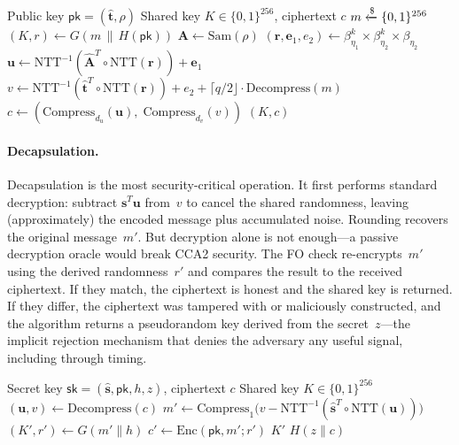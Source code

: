 \begin{algorithm}[t]
\caption{ML-KEM.$\Encaps$}
\label{alg:mlkem-encaps}
\begin{algorithmic}[1]
\Require Public key $\mathsf{pk} = (\hat{\mathbf{t}}, \rho)$
\Ensure Shared key $K \in \{0,1\}^{256}$, ciphertext $c$
\State $m \getsr \{0,1\}^{256}$
\State $(K, r) \gets G(m \,\|\, H(\mathsf{pk}))$ 
\State $\mathbf{A} \gets \mathrm{Sam}(\rho)$
\State $(\mathbf{r}, \mathbf{e}_1, e_2) \leftarrow \beta_{\eta_1}^k \times \beta_{\eta_2}^k \times \beta_{\eta_2}$ 
\State $\mathbf{u} \gets \mathrm{NTT}^{-1}(\hat{\mathbf{A}}^T \circ \mathrm{NTT}(\mathbf{r})) + \mathbf{e}_1$ 
\State $v \gets \mathrm{NTT}^{-1}(\hat{\mathbf{t}}^T \circ \mathrm{NTT}(\mathbf{r})) + e_2 + \lceil q/2 \rfloor\cdot \mathrm{Decompress}(m)$
\State $c \gets (\mathrm{Compress}_{d_u}(\mathbf{u}),\; \mathrm{Compress}_{d_v}(v))$
\State \Return $(K, c)$
\end{algorithmic}
\end{algorithm}

\paragraph{Decapsulation.}
Decapsulation is the most security-critical operation.  It first performs standard \mlwe{} decryption: subtract $\mathbf{s}^T \mathbf{u}$ from~$v$ to cancel the shared randomness, leaving (approximately) the encoded message plus accumulated noise.  Rounding recovers the original message~$m'$.  But decryption alone is not enough---a passive decryption oracle would break CCA2 security.  The FO check re-encrypts~$m'$ using the derived randomness~$r'$ and compares the result to the received ciphertext.  If they match, the ciphertext is honest and the shared key is returned.  If they differ, the ciphertext was tampered with or maliciously constructed, and the algorithm returns a pseudorandom key derived from the secret~$z$---the implicit rejection mechanism that denies the adversary any useful signal, including through timing.

\begin{algorithm}[t]
\caption{ML-KEM.$\Decaps$}
\label{alg:mlkem-decaps}
\begin{algorithmic}[1]
\Require Secret key $\mathsf{sk} = (\hat{\mathbf{s}}, \mathsf{pk}, h, z)$, ciphertext $c$
\Ensure Shared key $K \in \{0,1\}^{256}$
\State $(\mathbf{u}, v) \gets \mathrm{Decompress}(c)$
\State $m' \gets \mathrm{Compress}_1\bigl(v - \mathrm{NTT}^{-1}(\hat{\mathbf{s}}^T \circ \mathrm{NTT}(\mathbf{u}))\bigr)$ 
\State $(K', r') \gets G(m' \| h)$
\State $c' \gets \mathrm{Enc}(\mathsf{pk}, m'; r')$ 
  \State \Return $K'$ 
\Else
  \State \Return $H(z \| c)$ 
\EndIf
\end{algorithmic}
\end{algorithm}

